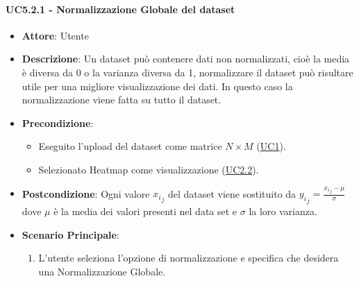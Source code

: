    \paragraph{UC5.2.1 - Normalizzazione Globale del dataset}
    \label{uc5.2.1}
    \begin{itemize}
    \item \textbf{Attore}: Utente
    \item \textbf{Descrizione}: Un dataset può contenere dati non normalizzati, cioè la media è diversa da 0 o la varianza diversa da 1, normalizzare il dataset può risultare utile per una migliore visualizzazione dei dati.
    In questo caso la normalizzazione viene fatta su tutto il dataset.
    \item \textbf{Precondizione}: 
    \begin{itemize}
        \item Eseguito l'upload del dataset come matrice $N\times M$ (\hyperref[uc1]{UC1}).
        \item Selezionato Heatmap come visualizzazione (\hyperref[uc2.2]{UC2.2}).
    \end{itemize}  
    \item \textbf{Postcondizione}:  Ogni valore ${x_i}_j$ del dataset viene sostituito da $ {y_i}_j = \frac{{x_i}_j - \mu}{\sigma}$ dove $\mu$ è la media dei valori presenti nel data set e $\sigma$ la loro varianza.
    \item \textbf{Scenario Principale}: 
    \begin{enumerate}
        \item L'utente seleziona l'opzione di normalizzazione e specifica che desidera una Normalizzazione Globale.
    \end{enumerate}  
    \end{itemize}
    
